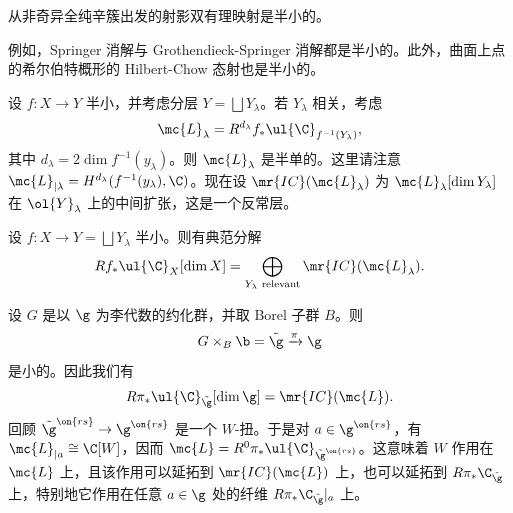 \begin{thm}
    从非奇异全纯辛簇出发的射影双有理映射是半小的。
\end{thm}

\begin{exm}
    例如，Springer 消解与 Grothendieck-Springer 消解都是半小的。此外，曲面上点的希尔伯特概形的 Hilbert-Chow 态射也是半小的。
\end{exm}

设 \(f \colon X \to Y\) 半小，并考虑分层 \(Y = \bigsqcup Y_{\lambda}\)。若 \(Y_{\lambda}\) 相关，考虑
\[ \mc{L}_{\lambda} = R^{d_{\lambda}} f_* \ul{\C}_{f^{-1}(Y_{\lambda})}, \]
其中 \(d_{\lambda} = 2 \dim f^{-1} (y_{\lambda})\)。则 \(\mc{L}_{\lambda}\) 是半单的。这里请注意 \(\mc{L}_{|\lambda} = H^{d_{\lambda}}(f^{-1}(y_{\lambda}), \C)\)。现在设 \(\mr{IC}(\mc{L}_{\lambda})\) 为 \(\mc{L}_{\lambda}[\dim Y_{\lambda}]\) 在 \(\ol{Y}_{\lambda}\) 上的中间扩张，这是一个反常层。

\begin{thm}
    设 \(f \colon X \to Y = \bigsqcup Y_{\lambda}\) 半小。则有典范分解
    \[ R f_* \ul{\C}_X[\dim X] = \bigoplus_{Y_{\lambda}\text{ relevant}} \mr{IC}(\mc{L}_{\lambda}). \]
\end{thm}

\begin{exm}
    设 \(G\) 是以 \(\g\) 为李代数的约化群，并取 Borel 子群 \(B\)。则
    \[ G \times_B \b = \tilde{\g} \xrightarrow{\pi} \g \]
    是小的。因此我们有
    \[ R \pi_* \ul{\C}_{\tilde{\g}} [\dim \g] = \mr{IC}(\mc{L}). \]
    回顾 \(\tilde{\g}^{\on{rs}} \to \g^{\on{rs}}\) 是一个 \(W\)-扭。于是对 \(a \in \g^{\on{rs}}\)，有 \(\mc{L}_{|a} \cong \C[W]\)，因而 \(\mc{L} = R^0 \pi_* \ul{\C}_{\tilde{\g}^{\on{rs}}}\)。这意味着 \(W\) 作用在 \(\mc{L}\) 上，且该作用可以延拓到 \(\mr{IC}(\mc{L})\) 上，也可以延拓到 \(R \pi_* \C_{\tilde{\g}}\) 上，特别地它作用在任意 \(a \in \g\) 处的纤维 \(R \pi_* \C_{\tilde{\g}}|_a\) 上。
\end{exm}

